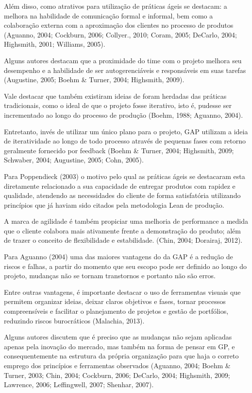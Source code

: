 Além disso, como atrativos para utilização de práticas ágeis se destacam: a melhora na habilidade de comunicação formal e informal, bem como a colaboração externa com a aproximação dos clientes no processo de produtos (Aguanno, 2004; Cockburn, 2006; Collyer., 2010; Coram, 2005; DeCarlo, 2004; Highsmith, 2001; Williams, 2005).

Alguns autores destacam que a proximidade do time com o projeto melhora seu desempenho e a habilidade de ser autogerenciáveis e responsáveis em suas tarefas (Augustine, 2005; Boehm \& Turner, 2004; Highsmith, 2009).

Vale destacar que também existiram ideias de foram herdadas das práticas tradicionais, como o ideal de que o projeto fosse iterativo, isto é, pudesse ser incrementado ao longo do processo de produção (Boehm, 1988; Aguanno, 2004).

Entretanto, invés de utilizar um único plano para o projeto, GAP utilizam a ideia de iteratividade ao longo de todo processo através de pequenas fases com retorno geralmente fornecido por feedback (Boehm \& Turner, 2004; Highsmith, 2009; Schwaber, 2004; Augustine, 2005; Cohn, 2005).

Para Poppendieck (2003) o motivo pelo qual as práticas ágeis se destacaram esta diretamente relacionado a sua capacidade de entregar produtos com rapidez e qualidade, atendendo as necessidades do cliente de forma satisfatória utilizando princípios que já haviam sido citados pela metodologia Lean de produção.

A marca de agilidade é também propiciar uma melhoria de performance a medida que o cliente colabora mais ativamente frente a demonstração do produto; além de trazer o conceito de flexibilidade e estabilidade. (Chin, 2004; Dorairaj, 2012).

Para Aguanno (2004) uma das maiores vantagens do da GAP é a redução de riscos e falhas, a partir do momento que seu escopo pode ser definido ao longo do projeto, mudanças não se tornam transtornos e portanto não são erros.

Entre outras vantagens, é importante destacar o uso de ferramentas visuais que permitem organizar ideias, deixar claros objetivos e fases, tornar processos compreensíveis e facilitar o planejamento de projetos e gestão de portfólios, reduzindo riscos burocráticos (Malachia, 2013).

Alguns autores discutem que é preciso que as mudanças não sejam aplicadas apenas pela inovação do mercado, mas também na forma de pensar em GP, e consequentemente na estrutura da própria organização para que haja o correto emprego dos princípios e ferramentas observados (Aguanno, 2004; Boehm \& Turner, 2003; Chin, 2004; Cockburn, 2006; DeCarlo, 2004; Highsmith, 2009; Lawrence, 2006; Leffingwell, 2007; Shenhar, 2007).

